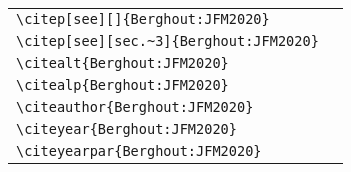\documentclass[a4paper,fleqn,uplatex,dvipdfmx]{jsarticle}
\begin{document}
\begin{table}[t]
\begin{tabular}{ll}
        \verb|\citep[see][]{Berghout:JFM2020}|         &\citep[see][]{Berghout:JFM2020} \\
        \verb|\citep[see][sec.~3]{Berghout:JFM2020}|         &\citep[see][sec.~3]{Berghout:JFM2020} \\
        \verb|\citealt{Berghout:JFM2020}|       &\citealt{Berghout:JFM2020} \\
        \verb|\citealp{Berghout:JFM2020}|       &\citealp{Berghout:JFM2020} \\
        \verb|\citeauthor{Berghout:JFM2020}|    &\citeauthor{Berghout:JFM2020} \\
        \verb|\citeyear{Berghout:JFM2020}|      &\citeyear{Berghout:JFM2020} \\
        \verb|\citeyearpar{Berghout:JFM2020}|   &\citeyearpar{Berghout:JFM2020}
    \end{tabular}
\end{table}
\end{document}
